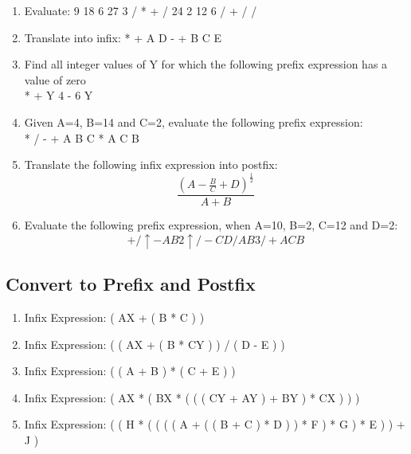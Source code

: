 \documentclass[10pt]{article}
\begin{document}
\begin{enumerate}

\item Evaluate: 9 18 6 27 3 / * + / 24 2 12 6 / + / /

\item Translate into infix: * + A D - + B C E

\item Find all integer values of Y for which the following prefix expression has
a value of zero\\
* + Y 4 - 6 Y

\item Given A=4, B=14 and C=2, evaluate the following prefix expression: \\
* / - + A B C * A C B

\item Translate the following infix expression into postfix:\\
\begin{equation*}
\frac{(A-\frac{B}{C}+D)^{\frac{1}{2}}}{A+B}
\end{equation*}

\item Evaluate the following prefix expression, when A=10, B=2, C=12 and D=2:\\
\begin{equation*}
+ / \uparrow - A B 2 \uparrow / - C D / A B 3 / + A C B
\end{equation*}
\end{enumerate}

\subsection{Convert to Prefix and Postfix}
\label{sec:convert}

\begin{enumerate}
\item Infix Expression: ( AX + ( B * C ) )

\item Infix Expression: ( ( AX + ( B * CY ) ) / ( D - E ) )

\item Infix Expression: ( ( A + B ) * ( C + E ) )

\item Infix Expression: ( AX * ( BX * ( ( ( CY + AY ) + BY ) * CX ) ) )

\item Infix Expression: ( ( H * ( ( ( ( A + ( ( B + C ) * D ) ) * F ) * G ) * E ) ) + J )
\end{enumerate}
\end{document}
